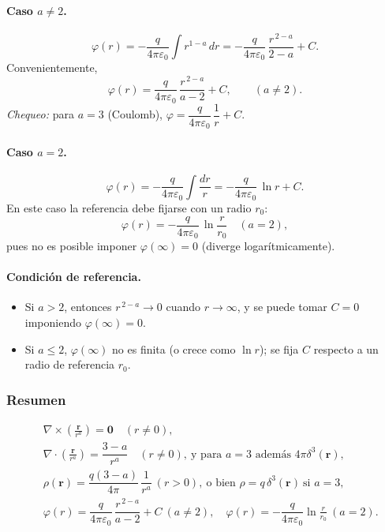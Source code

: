 \documentclass{article}
\begin{document}
\paragraph{Caso $a\neq 2$.}
\[
\varphi(r)=-\frac{q}{4\pi\varepsilon_0}\int r^{1-a}\,dr
=-\frac{q}{4\pi\varepsilon_0}\,\frac{r^{\,2-a}}{2-a}+C.
\]
Convenientemente,
\[
\boxed{\ \varphi(r)=\frac{q}{4\pi\varepsilon_0}\,\frac{r^{\,2-a}}{a-2}+C,\qquad (a\neq 2). \ }
\]
\emph{Chequeo:} para $a=3$ (Coulomb), $\varphi=\dfrac{q}{4\pi\varepsilon_0}\,\dfrac{1}{r}+C$.

\paragraph{Caso $a=2$.}
\[
\varphi(r)=-\frac{q}{4\pi\varepsilon_0}\int \frac{dr}{r}
=-\frac{q}{4\pi\varepsilon_0}\,\ln r + C.
\]
En este caso la referencia debe fijarse con un radio $r_0$:
\[
\boxed{\ \varphi(r)=-\frac{q}{4\pi\varepsilon_0}\,\ln\!\frac{r}{r_0}\quad (a=2),\ }
\]
pues no es posible imponer $\varphi(\infty)=0$ (diverge logarítmicamente).

\paragraph{Condición de referencia.}
\begin{itemize}
\item Si $a>2$, entonces $r^{\,2-a}\to 0$ cuando $r\to\infty$, y se puede tomar $C=0$ imponiendo $\varphi(\infty)=0$.
\item Si $a\le 2$, $\varphi(\infty)$ no es finita (o crece como $\ln r$); se fija $C$ respecto a un radio de referencia $r_0$.
\end{itemize}

\subsubsection*{Resumen}
\[
\boxed{\
\begin{aligned}
&\nabla\times\!\left(\frac{\mathbf r}{r^{a}}\right)=\mathbf 0\quad(r\neq 0),\\[6pt]
&\nabla\!\cdot\!\left(\frac{\mathbf r}{r^{a}}\right)=\dfrac{3-a}{r^{a}}\quad(r\neq 0),\ \text{y para }a=3\text{ además }4\pi\delta^{3}(\mathbf r),\\[6pt]
&\rho(\mathbf r)=\dfrac{q(3-a)}{4\pi}\,\dfrac{1}{r^{a}}\ (r>0),\ \text{o bien }\rho=q\,\delta^3(\mathbf r)\ \text{si }a=3,\\[6pt]
&\varphi(r)=\dfrac{q}{4\pi\varepsilon_0}\,\dfrac{r^{\,2-a}}{a-2}+C\ (a\neq 2),\quad
\varphi(r)=-\dfrac{q}{4\pi\varepsilon_0}\ln\!\frac{r}{r_0}\ (a=2).
\end{aligned}}
\]
\end{document}
